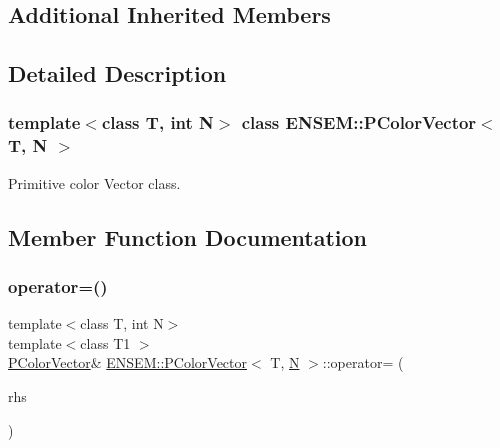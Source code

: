 \subsection*{Additional Inherited Members}


\subsection{Detailed Description}
\subsubsection*{template$<$class T, int N$>$\newline
class E\+N\+S\+E\+M\+::\+P\+Color\+Vector$<$ T, N $>$}

Primitive color Vector class. 

\subsection{Member Function Documentation}
\mbox{\label{classENSEM_1_1PColorVector_ac5919a92dade0bb7763353ed7d05b8b2}} 
\subsubsection{\texorpdfstring{operator=()}{operator=()}\hspace{0.1cm}{\footnotesize\ttfamily [1/3]}}
{\footnotesize\ttfamily template$<$class T, int N$>$ \\
template$<$class T1 $>$ \\
\mbox{\hyperlink{classENSEM_1_1PColorVector}{P\+Color\+Vector}}\& \mbox{\hyperlink{classENSEM_1_1PColorVector}{E\+N\+S\+E\+M\+::\+P\+Color\+Vector}}$<$ T, \mbox{\hyperlink{adat__devel_2lib_2hadron_2operator__name__util_8cc_a7722c8ecbb62d99aee7ce68b1752f337}{N}} $>$\+::operator= (\begin{DoxyParamCaption}\item[{const \mbox{\hyperlink{classENSEM_1_1PColorVector}{P\+Color\+Vector}}$<$ T1, \mbox{\hyperlink{adat__devel_2lib_2hadron_2operator__name__util_8cc_a7722c8ecbb62d99aee7ce68b1752f337}{N}} $>$ \&}]{rhs }\end{DoxyParamCaption})\hspace{0.3cm}{\ttfamily [inline]}}




